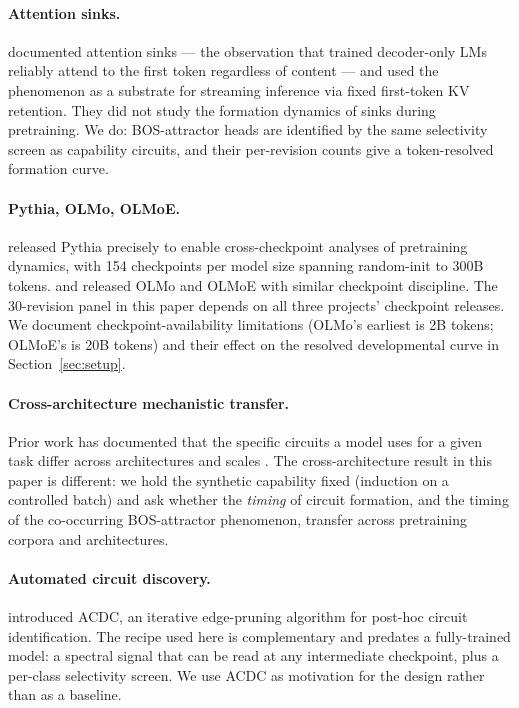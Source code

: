 \documentclass[11pt]{article}
\begin{document}
\paragraph{Attention sinks.}
\citet{xiao2024} documented attention sinks --- the observation that
trained decoder-only LMs reliably attend to the first token regardless of
content --- and used the phenomenon as a substrate for streaming inference
via fixed first-token KV retention. They did not study the formation
dynamics of sinks during pretraining. We do: BOS-attractor heads are
identified by the same selectivity screen as capability circuits, and
their per-revision counts give a token-resolved formation curve.

\paragraph{Pythia, OLMo, OLMoE.}
\citet{biderman2023} released Pythia precisely to enable cross-checkpoint
analyses of pretraining dynamics, with 154 checkpoints per model size
spanning random-init to 300B tokens. \citet{groeneveld2024} and
\citet{muennighoff2024} released OLMo and OLMoE with similar checkpoint
discipline. The 30-revision panel in this paper depends on all three
projects' checkpoint releases. We document checkpoint-availability
limitations (OLMo's earliest is 2B tokens; OLMoE's is 20B tokens) and
their effect on the resolved developmental curve in Section~\ref{sec:setup}.

\paragraph{Cross-architecture mechanistic transfer.}
Prior work has documented that the specific circuits a model uses for a
given task differ across architectures and scales
\citep{lieberum2023,wang2022ioi,marks2024sparse}. The cross-architecture
result in this paper is different: we hold the synthetic capability fixed
(induction on a controlled batch) and ask whether the \emph{timing} of
circuit formation, and the timing of the co-occurring BOS-attractor
phenomenon, transfer across pretraining corpora and architectures.

\paragraph{Automated circuit discovery.}
\citet{conmy2023} introduced ACDC, an iterative edge-pruning algorithm for
post-hoc circuit identification. The recipe used here is complementary and
predates a fully-trained model: a spectral signal that can be read at any
intermediate checkpoint, plus a per-class selectivity screen. We use ACDC
as motivation for the design rather than as a baseline.
\end{document}
